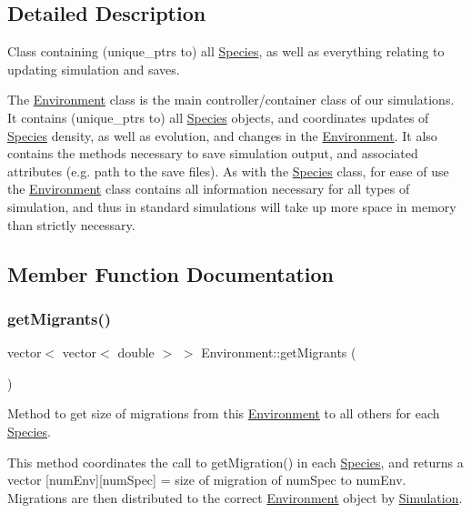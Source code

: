 \subsection{Detailed Description}
Class containing (unique\+\_\+ptrs to) all \hyperlink{classSpecies}{Species}, as well as everything relating to updating simulation and saves. 

The \hyperlink{classEnvironment}{Environment} class is the main controller/container class of our simulations. It contains (unique\+\_\+ptrs to) all \hyperlink{classSpecies}{Species} objects, and coordinates updates of \hyperlink{classSpecies}{Species} density, as well as evolution, and changes in the \hyperlink{classEnvironment}{Environment}. It also contains the methods necessary to save simulation output, and associated attributes (e.\+g. path to the save files). As with the \hyperlink{classSpecies}{Species} class, for ease of use the \hyperlink{classEnvironment}{Environment} class contains all information necessary for all types of simulation, and thus in standard simulations will take up more space in memory than strictly necessary. 

\subsection{Member Function Documentation}
\hypertarget{classEnvironment_af85970e5c7ad4c80b9432cacbf6c2d2b}{}\label{classEnvironment_af85970e5c7ad4c80b9432cacbf6c2d2b} 
\subsubsection{\texorpdfstring{get\+Migrants()}{getMigrants()}}
{\footnotesize\ttfamily vector$<$ vector$<$ double $>$ $>$ Environment\+::get\+Migrants (\begin{DoxyParamCaption}{ }\end{DoxyParamCaption})}



Method to get size of migrations from this \hyperlink{classEnvironment}{Environment} to all others for each \hyperlink{classSpecies}{Species}. 

This method coordinates the call to get\+Migration() in each \hyperlink{classSpecies}{Species}, and returns a vector \mbox{[}num\+Env\mbox{]}\mbox{[}num\+Spec\mbox{]} = size of migration of num\+Spec to num\+Env. Migrations are then distributed to the correct \hyperlink{classEnvironment}{Environment} object by \hyperlink{classSimulation}{Simulation}.

